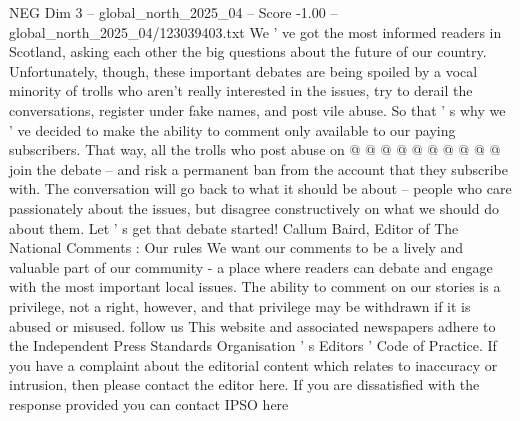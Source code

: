 \begin{textsample}{NEG Dim 3 – global\_north\_2025\_04 – Score -1.00 – global\_north\_2025\_04/123039403.txt}
We ' ve got the most informed readers in Scotland, asking each other the big questions about the future of our country.
Unfortunately, though, these important debates are being spoiled by a vocal minority of trolls who aren't really interested in the issues, try to derail the conversations, register under fake names, and post vile abuse.
So that ' s why we ' ve decided to make the ability to comment only available to our paying subscribers.
That way, all the trolls who post abuse on @ @ @ @ @ @ @ @ @ @ join the debate -- and risk a permanent ban from the account that they subscribe with.
The conversation will go back to what it should be about -- people who care passionately about the issues, but disagree constructively on what we should do about them.
Let ' s get that debate started!
Callum Baird, Editor of The National Comments : Our rules We want our comments to be a lively and valuable part of our community - a place where readers can debate and engage with the most important local issues.
The ability to comment on our stories is a privilege, not a right, however, and that privilege may be withdrawn if it is abused or misused. follow us This website and associated newspapers adhere to the Independent Press Standards Organisation ' s Editors ' Code of Practice.
If you have a complaint about the editorial content which relates to inaccuracy or intrusion, then please contact the editor here.
If you are dissatisfied with the response provided you can contact IPSO here

\end{textsample}
